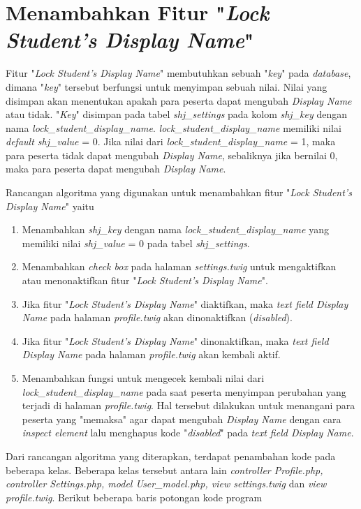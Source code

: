 \section{Menambahkan Fitur "\textit{Lock Student's Display Name}"}
\label{chap:lock}
Fitur "\textit{Lock Student's Display Name}" membutuhkan sebuah "\textit{key}" pada \textit{database}, dimana "\textit{key}" tersebut berfungsi untuk menyimpan sebuah nilai. Nilai yang disimpan akan menentukan apakah para peserta dapat mengubah \textit{Display Name} atau tidak. "\textit{Key}" disimpan pada tabel \textit{shj\_settings} pada kolom \textit{shj\_key} dengan nama \textit{lock\_student\_display\_name}. \textit{lock\_student\_display\_name} memiliki nilai \textit{default shj\_value} = 0. Jika nilai dari \textit{lock\_student\_display\_name} = 1, maka para peserta tidak dapat mengubah \textit{Display Name}, sebaliknya jika bernilai 0, maka para peserta dapat mengubah \textit{Display Name}.

Rancangan algoritma yang digunakan untuk menambahkan fitur "\textit{Lock Student's Display Name}" yaitu
\begin{enumerate}
	\item Menambahkan \textit{shj\_key} dengan nama \textit{lock\_student\_display\_name} yang memiliki nilai \textit{shj\_value} = 0 pada tabel \textit{shj\_settings}.
	\item Menambahkan \textit{check box} pada halaman \textit{settings.twig} untuk mengaktifkan atau menonaktifkan fitur "\textit{Lock Student's Display Name}".
	\item Jika fitur "\textit{Lock Student's Display Name}" diaktifkan, maka \textit{text field Display Name} pada halaman \textit{profile.twig} akan dinonaktifkan (\textit{disabled}).
	\item Jika fitur "\textit{Lock Student's Display Name}" dinonaktifkan, maka \textit{text field Display Name} pada halaman \textit{profile.twig} akan kembali aktif.
	\item Menambahkan fungsi untuk mengecek kembali nilai dari \textit{lock\_student\_display\_name} pada saat peserta menyimpan perubahan yang terjadi di halaman \textit{profile.twig}. Hal tersebut dilakukan untuk menangani para peserta yang "memaksa" agar dapat mengubah \textit{Display Name} dengan cara \textit{inspect element} lalu menghapus kode "\textit{disabled}" pada \textit{text field Display Name}.
\end{enumerate}

Dari rancangan algoritma yang diterapkan, terdapat penambahan kode pada beberapa kelas. Beberapa kelas tersebut antara lain \textit{controller Profile.php, controller Settings.php, model User\_model.php, view settings.twig} dan \textit{view profile.twig}.
Berikut beberapa baris potongan kode program

